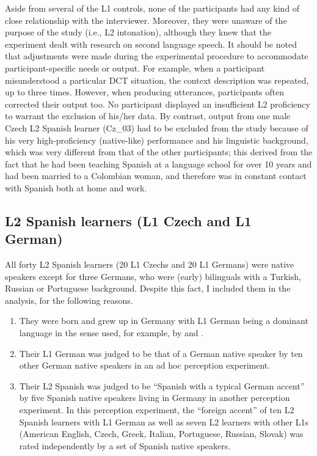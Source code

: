 Aside from several of the L1 controls, none of the participants had any kind of close relationship with the interviewer. Moreover, they were unaware of the purpose of the study (i.e., L2 intonation), although they knew that the experiment dealt with research on second language speech. It should be noted that adjustments were made during the experimental procedure to accommodate par\-tic\-i\-pant-specific needs or output. For example, when a participant misunderstood a particular DCT situation, the context description was repeated, up to three times. However, when producing utterances, participants often corrected their output too. No participant displayed an insufficient L2 proficiency to warrant the exclusion of his/her data. By contrast, output from one male Czech L2 Spanish learner (Cz\_03) had to be excluded from the study because of his very high-proficiency (native-like) performance and his linguistic background, which was very different from that of the other participants; this derived from the fact that he had been teaching Spanish at a language school for over 10 years and had been married to a Colombian woman, and therefore was in constant contact with Spanish both at home and work.


\subsection{L2 Spanish learners (L1 Czech and L1 German)}\label{sec:3.2.1}\largerpage[2]

All forty L2 Spanish learners (20 L1 Czechs and 20 L1 Germans) were native speakers except for three Germans, who were (early) bilinguals with a Turkish, Russian or Portuguese background. Despite this fact, I included them in the analysis, for the following reasons.



\begin{enumerate}[label={(\arabic*)}]
\item
          They were born and grew up in Germany with L1 German being a dominant language in the sense used, for example, by \citet{Grosjean1982, Grosjean2008} and \citet{Montrul2013}.



\item
          Their L1 German was judged to be that of a German native speaker by ten other German native speakers in an ad hoc perception experiment.



\item
           Their L2 Spanish was judged to be “Spanish with a typical German accent” by five Spanish native speakers living in Germany in another perception experiment. In this perception experiment, the “foreign accent” of ten L2 Spanish learners with L1 German as well as seven L2 learners with other L1s (American English, Czech, Greek, Italian, Portuguese, Russian, Slovak) was rated independently by a set of Spanish native speakers.
\end{enumerate}\largerpage[2]


